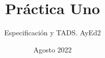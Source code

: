 
\setlength{\parindent}{0pt}

\title{Práctica Uno}
\author{Especificación y TADS. AyEd2}
\date{Agosto 2022}



\maketitle




